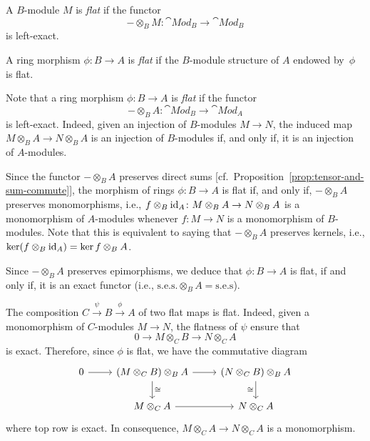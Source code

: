 \begin{defn}
    A $B$-module $M$ is \textsl{flat} if the functor
    $$
        -\otimes_BM\colon\cat{Mod}_B\to\cat{Mod}_B
    $$
    is left-exact.
    
    A ring morphism $\phi\colon B\to A$ is \textsl{flat} if the $B$-module structure of $A$ endowed by~$\phi$ is flat.
\end{defn}

\begin{rem}
    Note that a ring morphism $\phi\colon B\to A$ is \textsl{flat} if the functor
    $$
        -\otimes_BA\colon\cat{Mod}_B\to\cat{Mod}_A
    $$
    is left-exact. Indeed, given an injection of $B$-modules $M\to N$, the induced map $M\otimes_BA\to N\otimes_BA$ is an injection of $B$-modules if, and only if, it is an injection of $A$-modules.
\end{rem}

\begin{rem}
    Since the functor $-\otimes_BA$ preserves direct sums [cf.~Proposition~\ref{prop:tensor-and-sum-commute}], the morphism of rings $\phi\colon B\to A$ is flat if, and only if, $-\otimes_BA$ preserves monomorphisms, i.e., $f\otimes_B\text{\rm id}_A\colon M\otimes_BA\to N\otimes_BA$ is a monomorphism of $A$-modules whenever $f\colon M\to N$ is a monomorphism of $B$-modules. Note that this is equivalent to saying that $-\otimes_BA$ preserves kernels, i.e., $\ker(f\otimes_B\text{\rm id}_A)=\ker f\otimes_BA$.

    Since $-\otimes_BA$ preserves epimorphisms, we deduce that $\phi\colon B\to A$ is flat, if and only if, it is an exact functor (i.e., $\text{s.e.s.}\otimes_BA=\text{s.e.s}$).
\end{rem}

\begin{rem}\label{rem:flat-composition}
    The composition $C\stackrel{\psi}{\to}B\stackrel{\phi}{\to}A$ of two flat maps is flat. Indeed, given a monomorphism of $C$-modules $M\to N$, the flatness of $\psi$ ensure that
    $$
        0\to M\otimes_CB\to N\otimes_CA
    $$
    is exact. Therefore, since $\phi$ is flat, we have the commutative diagram
    $$
        \begin{tikzcd}
            0
                    \arrow[r]
                &(M\otimes_CB)\otimes_BA
                    \arrow[r]\arrow[d,"\cong"]
                &(N\otimes_CB)\otimes_BA
                    \arrow[d,"\cong"']\\
                &M\otimes_CA
                    \arrow[r]
                &N\otimes_CA
        \end{tikzcd}
    $$
    where top row is exact. In consequence, $M\otimes_CA\to N\otimes_CA$ is a monomorphism.
\end{rem}

